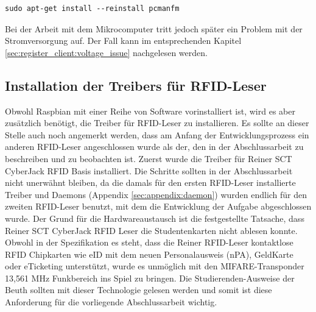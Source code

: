 \begin{lstlisting}
sudo apt-get install --reinstall pcmanfm
\end{lstlisting}
Bei der Arbeit mit dem Mikrocomputer tritt jedoch später ein Problem mit der Stromversorgung auf. Der Fall kann im entsprechenden Kapitel \ref{sec:register_client:voltage_issue} nachgelesen werden.


\subsection{Installation der Treibers für RFID-Leser}
\label{sec:register_client:install_rfid}
Obwohl Raspbian mit einer Reihe von Software vorinstalliert ist, wird es aber zusätzlich benötigt, die Treiber für RFID-Leser zu installieren. Es sollte an dieser Stelle auch noch angemerkt werden, dass am Anfang der Entwicklungsprozess ein anderen RFID-Leser angeschlossen wurde als der, den in der Abschlussarbeit zu beschreiben und zu beobachten ist. Zuerst wurde die Treiber für Reiner SCT CyberJack RFID Basis\cite{website:4} installiert. Die Schritte sollten in der Abschlussarbeit nicht unerwähnt bleiben, da die damals für den ersten RFID-Leser installierte Treiber und Daemons (Appendix \ref{sec:appendix:daemon}) wurden endlich für den zweiten RFID-Leser benutzt, mit dem die Entwicklung der Aufgabe abgeschlossen wurde. Der Grund für die Hardwareaustausch ist die festgestellte Tatsache, dass Reiner SCT CyberJack RFID Leser die Studentenkarten nicht ablesen konnte. Obwohl in der Spezifikation es steht, dass die Reiner RFID-Leser kontaktlose RFID Chipkarten wie eID mit dem neuen Personalausweis (nPA), GeldKarte oder eTicketing unterstützt, wurde es unmöglich mit den MIFARE-Transponder 13,561 MHz Funkbereich ins Spiel zu bringen. Die Studierenden-Ausweise der Beuth sollten mit dieser Technologie gelesen werden und somit ist diese Anforderung für die vorliegende Abschlussarbeit wichtig. 

